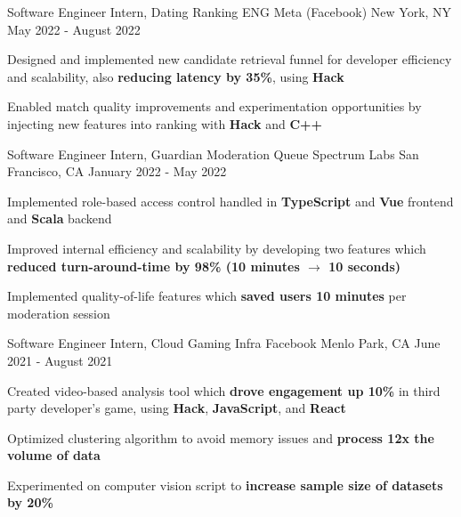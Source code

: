 

\begin{cventries}
  \cventry
    {Software Engineer Intern, Dating Ranking ENG} %
    {Meta (Facebook)} %
    {New York, NY} %
    {May 2022 - August 2022} %
    {
      \begin{cvitems} %
        \item {Designed and implemented new candidate retrieval funnel for developer efficiency and scalability, also \textbf{reducing latency by 35\%}, using \textbf{Hack}}
        \item {Enabled match quality improvements and experimentation opportunities by injecting new features into ranking with \textbf{Hack} and \textbf{C++}}
      \end{cvitems}
    }

  \cventry
    {Software Engineer Intern, Guardian Moderation Queue} %
    {Spectrum Labs} %
    {San Francisco, CA} %
    {January 2022 - May 2022} %
    {
      \begin{cvitems} %
        \item {Implemented role-based access control handled in \textbf{TypeScript} and \textbf{Vue} frontend and \textbf{Scala} backend}
        \item {Improved internal efficiency and scalability by developing two features which \textbf{reduced turn-around-time by 98\% (10 minutes $\rightarrow$ 10 seconds)}}
        \item {Implemented quality-of-life features which \textbf{saved users 10 minutes} per moderation session}
      \end{cvitems}
    }

  \cventry
    {Software Engineer Intern, Cloud Gaming Infra} %
    {Facebook} %
    {Menlo Park, CA} %
    {June 2021 - August 2021} %
    {
      \begin{cvitems} %
        \item {Created video-based analysis tool which \textbf{drove engagement up 10\%} in third party developer's game, using \textbf{Hack}, \textbf{JavaScript}, and \textbf{React}}
        \item {Optimized clustering algorithm to avoid memory issues and \textbf{process 12x the volume of data}}
        \item {Experimented on computer vision script to \textbf{increase sample size of datasets by 20\%}}
      \end{cvitems}
    }


\end{cventries}
